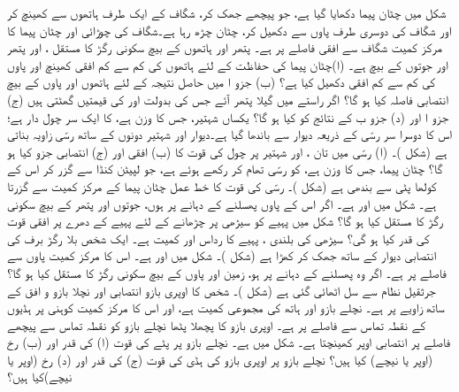 شکل  میں چٹان پیما   دکھایا گیا ہے، جو  پیچھے جھک  کر،    شگاف کے ایک طرف ہاتھوں سے کھینچ کر اور  شگاف کی دوسری طرف پاوں سے دکھیل کر،  چٹان چڑھ رہا ہے۔شگاف کی چوڑائی    اور چٹان پیما کا مرکز کمیت  شگاف سے  افقی فاصلے پر ہے۔ پتھر اور ہاتھوں کے بیچ سکونی رگڑ کا مستقل ، اور  پتھر اور جوتوں کے بیچ  ہے۔ (ا)چٹان پیما کی حفاظت    کے لئے  ہاتھوں کی کم سے کم افقی  کھینچ اور  پاوں کی کم سے کم  افقی دکھیل  کیا ہے؟ (ب) جزو ا میں حاصل  نتیجہ کے لئے ہاتھوں اور پاوں کے بیچ  انتصابی فاصلہ  کیا ہو گا؟ اگر راستے میں گیلا پتھر  آئے جس کی بدولت  اور  کی قیمتیں گھٹتی ہیں (ج) جزو ا اور (د) جزو ب کے نتائج کو کیا ہو گا؟
یکساں شہتیر، جس کا وزن  ہے، کا ایک سر چول دار ہے؛ اس کا دوسرا سر رسّی  کے ذریعہ  دیوار سے باندھا گیا ہے۔دیوار اور شہتیر دونوں کے ساتھ  رسّی زاویہ  بناتی ہے (شکل )۔ (ا) رسّی میں تان ، اور  شہتیر  پر   چول کی قوت کا (ب) افقی اور (ج) انتصابی جزو  کیا ہو گا؟
چٹان پیما، جس کا وزن  ہے، کو  رسّی  تھام کر رکھے ہوئے ہے، جو لپیٹن کنڈا سے گزر کر  اس کے کولھا پٹی سے بندھی ہے (شکل )۔ رسّی  کی قوت کا خط عمل چٹان پیما کے مرکز کمیت سے گزرتا ہے۔ شکل میں  اور  ہے۔ اگر اس کے پاوں پھسلنے  کے دہانے پر  ہوں، جوتوں اور  پتھر  کے بیچ سکونی رگڑ کا مستقل کیا ہو گا؟
شکل  میں پہیے کو سیڑھی پر چڑھانے کے لئے پہیے کے  دھرے پر  افقی قوت  کی قدر  کیا ہو گی؟ سیڑھی کی بلندی
  ،  پہیے کا رداس   اور کمیت  ہے۔
ایک شخص بلا رگڑ   برف کی انتصابی دیوار کے ساتھ   جھک کر کھڑا ہے (شکل )۔ شکل میں  اور 
 ہے۔ اس کا مرکز کمیت  پاوں سے  فاصلے پر ہے۔ اگر وہ پھسلنے کے دہانے پر ہو، زمین اور پاوں کے بیچ سکونی رگڑ کا مستقل کیا ہو گا؟
جرثقیل نظام سے   سل اٹھائی گئی ہے (شکل )۔ شخص کا اوپری  بازو انتصابی  اور  نچلا بازو و  افق کے ساتھ  زاویے پر ہے۔ نچلے بازو   اور ہاتھ کی  مجموعی  کمیت  ہے، اور اس کا مرکز کمیت کوہنی  پر ہڈیوں کے نقطہ تماس سے  فاصلے پر ہے۔ اوپری   بازو کا  پچھلا پٹھا    نچلے بازو کو  نقطہ تماس سے  پیچھے  فاصلے پر انتصابی   اوپر کھینچتا  ہے۔ شکل میں  ہے۔   نچلے بازو  پر  پٹے کی قوت (ا)  کی قدر اور (ب) رخ (اوپر یا نیچے)  کیا ہیں؟ نچلے  بازو پر اوپری  بازو کی ہڈی  کی قوت (ج) کی قدر اور (د) رخ  (اوپر یا نیچے)کیا ہیں؟
